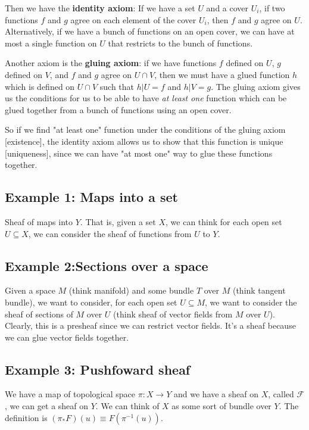 \documentclass{book}
\newcommand{\F}{\ensuremath{\mathcal{F}}}
\theoremstyle{definition}
\begin{document}
Then we have the \textbf{identity axiom}: If we have a set $U$ and a cover $U_i$,
if two functions $f$ and $g$ agree on each element of the cover $U_i$, then $f$
and $g$ agree on $U$. Alternatively, if we have a bunch of functions on an open cover,
we can have at most a single function on $U$ that restricts to the bunch of functions.

Another axiom is the \textbf{gluing axiom}: if we have functions $f$ defined on $U$, $g$ defined on $V$,
and $f$ and $g$ agree on $U \cap V$, then we must have a glued function $h$ 
which is defined on $U \cap V$ such that $h|U = f$ and $h|V = g$. The gluing
axiom gives us the conditions for us to be able to have \emph{at least one} function
which can be glued together from a bunch of functions using an open cover.

So if we find "at least one" function under
the conditions of the gluing axiom [existence], the identity axiom allows us to
show that this function is unique [uniqueness], since we can have "at most one"
way to glue these functions together.

\subsection{Example 1: Maps into a set}

Sheaf of maps into $Y$. That is, given a set $X$, we can think for each open
set $U \subseteq X$, we can consider the sheaf of functions from $U$ to $Y$.

\subsection{Example 2:Sections over a space}

Given a space $M$ (think manifold) and some bundle $T$ over $M$ (think tangent bundle),
we want to consider, for each open set $U \subseteq M$, we want to consider
the sheaf of sections of $M$ over $U$ (think sheaf of vector fields from $M$ over $U$).
Clearly, this is a presheaf since we can restrict vector fields. It's a sheaf
because we can glue vector fields together.


\subsection{Example 3: Pushfoward sheaf}

We have a map of topological space $\pi: X \rightarrow Y$ and we have a sheaf on $X$,
called $\F$ , we can get a sheaf on $Y$. We can think of $X$ as some sort of bundle
over $Y$. The definition is $(\pi_* F)(u) \equiv F(\pi^{-1}(u))$.
\end{document}

